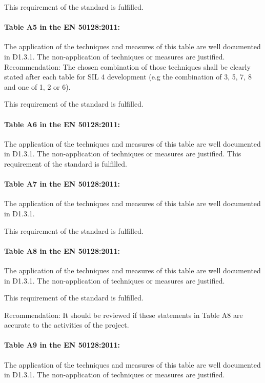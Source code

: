 This requirement of the standard is fulfilled.

\paragraph{Table A5 in the EN 50128:2011:}

The application of the techniques and measures of this table are well documented in D1.3.1. The non-application of techniques or measures are justified.
Recommendation: The chosen combination of those techniques shall be clearly stated after each table for SIL 4 development (e.g the combination of 3, 5, 7, 8 and one of 1, 2 or 6).

This requirement of the standard is fulfilled.

\paragraph{Table A6 in the EN 50128:2011:}

The application of the techniques and measures of this table are well documented in D1.3.1. The non-application of techniques or measures are justified.
This requirement of the standard is fulfilled.

\paragraph{Table A7 in the EN 50128:2011:}
The application of the techniques and measures of this table are well documented in D1.3.1.

This requirement of the standard is fulfilled.

\paragraph{Table A8 in the EN 50128:2011:}
The application of the techniques and measures of this table are well documented in D1.3.1. The non-application of techniques or measures are justified.

This requirement of the standard is fulfilled.

Recommendation: It should be reviewed if these statements in Table A8 are accurate to the activities of the project.

\paragraph{Table A9 in the EN 50128:2011:}
The application of the techniques and measures of this table are well documented in D1.3.1. The non-application of techniques or measures are justified.

